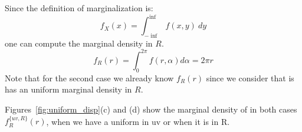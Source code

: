 Since the definition of marginalization is:
%
\begin{equation}
f_X(x)=\int_{-\inf}^{\inf} f(x,y)\ dy
\end{equation}
%
one can compute the marginal density in $R$.
%
\begin{equation}
f_R(r)=\int^{2\pi}_0 f(r,\alpha) d\alpha =2\pi r
\end{equation}
%
Note that for the second case we already know $f_R(r)$ since we consider that is has an uniform marginal density in $R$.

Figures~\ref{fig:uniform_disp}(c) and (d) show the marginal density of in both cases $f^{\{uv,R\}}_R(r)$, when we have a uniform in uv or when it is in R.

